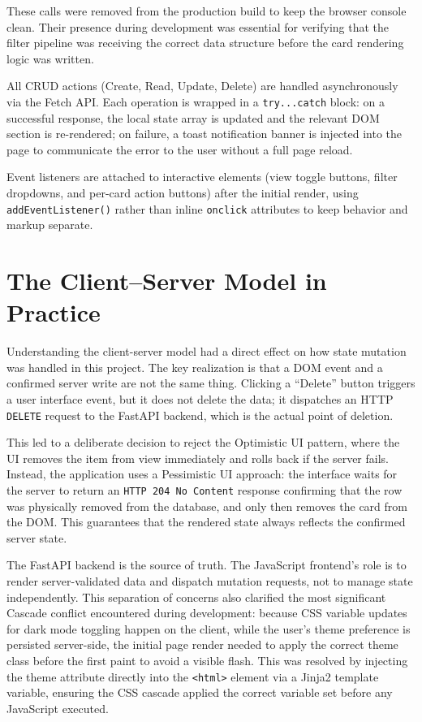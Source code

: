 \documentclass[11pt,a4paper]{book}
\begin{document}
These calls were removed from the production build to keep the browser console clean. Their presence during development was essential for verifying that the filter pipeline was receiving the correct data structure before the card rendering logic was written.

All CRUD actions (Create, Read, Update, Delete) are handled asynchronously via the Fetch API. Each operation is wrapped in a \texttt{try...catch} block: on a successful response, the local state array is updated and the relevant DOM section is re-rendered; on failure, a toast notification banner is injected into the page to communicate the error to the user without a full page reload.

Event listeners are attached to interactive elements (view toggle buttons, filter dropdowns, and per-card action buttons) after the initial render, using \texttt{addEventListener()} rather than inline \texttt{onclick} attributes to keep behavior and markup separate.

\section{The Client--Server Model in Practice}

Understanding the client-server model had a direct effect on how state mutation was handled in this project. The key realization is that a DOM event and a confirmed server write are not the same thing. Clicking a ``Delete'' button triggers a user interface event, but it does not delete the data; it dispatches an HTTP \texttt{DELETE} request to the FastAPI backend, which is the actual point of deletion.

This led to a deliberate decision to reject the Optimistic UI pattern, where the UI removes the item from view immediately and rolls back if the server fails. Instead, the application uses a Pessimistic UI approach: the interface waits for the server to return an \texttt{HTTP 204 No Content} response confirming that the row was physically removed from the database, and only then removes the card from the DOM. This guarantees that the rendered state always reflects the confirmed server state.

The FastAPI backend is the source of truth. The JavaScript frontend's role is to render server-validated data and dispatch mutation requests, not to manage state independently. This separation of concerns also clarified the most significant Cascade conflict encountered during development: because CSS variable updates for dark mode toggling happen on the client, while the user's theme preference is persisted server-side, the initial page render needed to apply the correct theme class before the first paint to avoid a visible flash. This was resolved by injecting the theme attribute directly into the \texttt{<html>} element via a Jinja2 template variable, ensuring the CSS cascade applied the correct variable set before any JavaScript executed.
\end{document}
